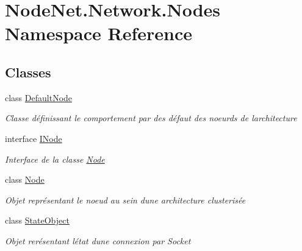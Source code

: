 \hypertarget{namespace_node_net_1_1_network_1_1_nodes}{}\section{Node\+Net.\+Network.\+Nodes Namespace Reference}
\label{namespace_node_net_1_1_network_1_1_nodes}
\subsection*{Classes}
\begin{DoxyCompactItemize}
\item 
class \hyperlink{class_node_net_1_1_network_1_1_nodes_1_1_default_node}{Default\+Node}
\begin{DoxyCompactList}\small\item\em Classe définissant le comportement par des défaut des noeurds de l\textquotesingle{}architecture \end{DoxyCompactList}\item 
interface \hyperlink{interface_node_net_1_1_network_1_1_nodes_1_1_i_node}{I\+Node}
\begin{DoxyCompactList}\small\item\em Interface de la classe \hyperlink{class_node_net_1_1_network_1_1_nodes_1_1_node}{Node} \end{DoxyCompactList}\item 
class \hyperlink{class_node_net_1_1_network_1_1_nodes_1_1_node}{Node}
\begin{DoxyCompactList}\small\item\em Objet représentant le noeud au sein d\textquotesingle{}une architecture clusterisée \end{DoxyCompactList}\item 
class \hyperlink{class_node_net_1_1_network_1_1_nodes_1_1_state_object}{State\+Object}
\begin{DoxyCompactList}\small\item\em Objet rerésentant l\textquotesingle{}état d\textquotesingle{}une connexion par Socket \end{DoxyCompactList}\end{DoxyCompactItemize}
